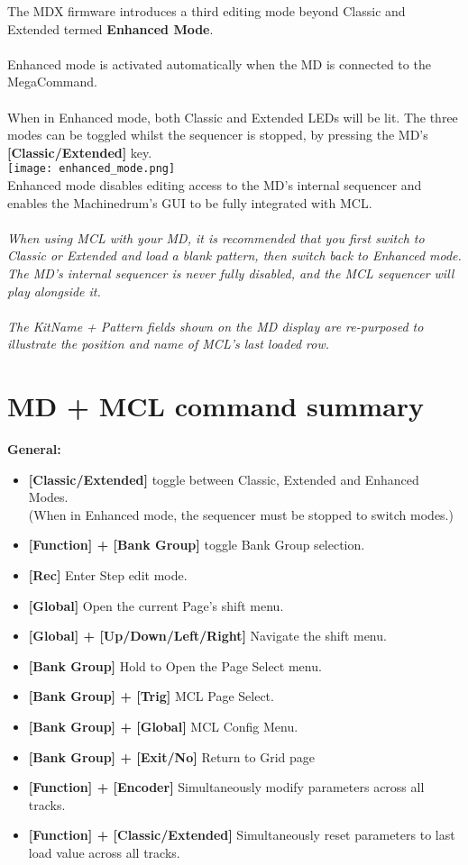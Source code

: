 The MDX firmware introduces a third editing mode beyond Classic and Extended termed \textbf{Enhanced Mode}.\\
\\
Enhanced mode is activated automatically when the MD is connected to the MegaCommand.\\
\\
When in Enhanced mode, both Classic and Extended LEDs will be lit. The three modes can be toggled whilst the sequencer is stopped, by pressing the MD's \textbf{[Classic/Extended]} key.\\
\texttt{[image: enhanced\_mode.png]}\\
Enhanced mode disables editing access to the MD's internal sequencer and enables the Machinedrum's GUI to be fully integrated with MCL.
\\\\
\textit{When using MCL with your MD, it is recommended that you first switch to Classic or Extended and load a blank pattern, then switch back to Enhanced mode. The MD's internal sequencer is never fully disabled, and the MCL sequencer will play alongside it.\\\\
The KitName + Pattern fields shown on the MD display are re-purposed to illustrate the position and name of MCL's last loaded row.
}
\newpage
\section{MD + MCL command summary}

\textbf{General:}
   \begin{itemize}
      \item \textbf{[Classic/Extended] } toggle between Classic, Extended and Enhanced Modes.\\(When in Enhanced mode, the sequencer must be stopped to switch modes.)
      \item \textbf{[Function] + [Bank Group]} toggle Bank Group selection.
      \item \textbf{[Rec]} Enter Step edit mode.
      \item \textbf{[Global]} Open the current Page's shift menu.
      \item \textbf{[Global] + [Up/Down/Left/Right]} Navigate the shift menu.
      \item \textbf{[Bank Group]} Hold to Open the Page Select menu.
      \item \textbf{[Bank Group] + [Trig]} MCL Page Select.
      \item \textbf{[Bank Group] + [Global]} MCL Config Menu. 
      \item \textbf{[Bank Group] + [Exit/No]} Return to Grid page
      \item \textbf{[Function] + [Encoder]} Simultaneously modify parameters across all tracks. 
       \item \textbf{[Function] + [Classic/Extended]} Simultaneously reset parameters to last load value across all tracks.
 \end{itemize}
 
